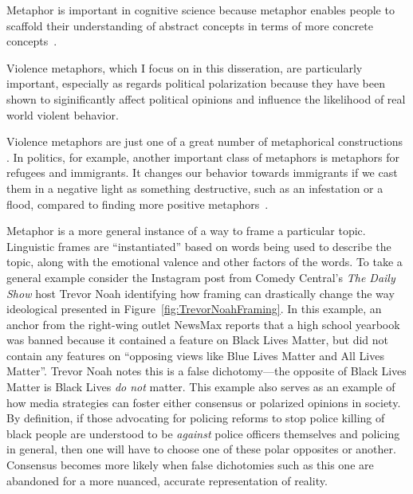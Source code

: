 \documentclass[12pt,letterpaper]{article}
\begin{document}
Metaphor is important in cognitive science because metaphor enables people 
to scaffold their understanding of abstract concepts in terms of more concrete
concepts~\cite{Lakoff1980,Gibbs2011,Gibbs2012a,Kovecses2017}. 

Violence metaphors, which I focus on in this disseration, 
are particularly important, especially as regards political
polarization because they have been shown 
to siginificantly affect political opinions and influence the likelihood of
real world violent behavior. 

Violence metaphors are just one of a great number of metaphorical constructions
\cite{Goldberg2003,Goldberg2006,Dodge2015}. 
In politics, for example, another important class of metaphors is
metaphors for refugees and immigrants. It changes our behavior towards 
immigrants if we cast them in a negative light as something destructive, 
such as an infestation or a flood, compared to finding more positive 
metaphors~\cite{OBrien2003,Cisneros2008}.

Metaphor is a more general instance of a way to frame a particular topic. 
Linguistic frames are ``instantiated'' based on words being used to describe the
topic, along with the emotional valence and other factors of the words. To take
a general example consider the Instagram post from Comedy Central's 
\emph{The Daily Show} host Trevor Noah identifying how
framing can drastically change the way ideological presented in Figure~\ref{fig:TrevorNoahFraming}. In this example, an anchor from the right-wing outlet NewsMax
reports that a high school yearbook was banned because it contained a feature
on Black Lives Matter, but did not contain any features on ``opposing views
like Blue Lives Matter and All Lives Matter''. Trevor Noah notes this is a 
false dichotomy---the opposite of Black Lives Matter is Black Lives \emph{do not}
matter. This example also serves as an example of how media strategies can 
foster either consensus or polarized opinions in society. By definition, if
those advocating for policing reforms to stop police killing of black people
are understood to be \emph{against} police officers themselves and policing
in general, then one will have to choose one of these polar opposites or 
another. Consensus becomes more likely when false dichotomies such as this one
are abandoned for a more nuanced, accurate representation of reality.
\end{document}
